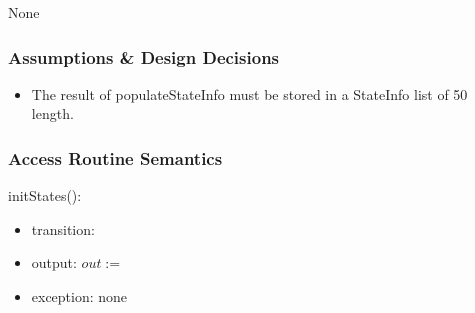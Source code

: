 \documentclass[12pt]{article}
\begin{document}
None

\subsubsection* {Assumptions \& Design Decisions}

\begin{itemize}
\item The result of populateStateInfo must be stored in a StateInfo list of 50 length.
\end{itemize}

\subsubsection* {Access Routine Semantics}

initStates():
\begin{itemize}
\item transition: 
\item output: $\mathit{out} :=$
\item exception: none
\end{itemize}

\newpage
\end{document}
